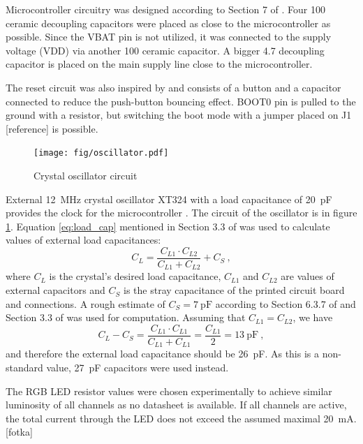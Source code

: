 Microcontroller circuitry was designed according to Section 7 of \cite{f3_design_an}. Four \SI{100}{\nF} ceramic decoupling capacitors were placed as close to the microcontroller as possible. Since the VBAT pin is not utilized, it was connected to the supply voltage (VDD) via another \SI{100}{\nF} ceramic capacitor. A bigger \SI{4.7}{\uF} decoupling capacitor is placed on the main supply line close to the microcontroller.

The reset circuit was also inspired by \cite{f3_design_an} and consists of a button and a capacitor connected to reduce the push-button bouncing effect. BOOT0 pin is pulled to the ground with a resistor, but switching the boot mode with a jumper placed on J1 [\todo reference] is possible.

\begin{figure}[t]
\centering
\texttt{[image: fig/oscillator.pdf]}
\caption{Crystal oscillator circuit}
\label{fig:osc}
\end{figure}

External \SI{12}{\MHz} crystal oscillator XT324 with a load capacitance of \SI{20}{\pF} provides the clock for the microcontroller \cite{xt324_datasheet}. The circuit of the oscillator is in figure \ref{fig:osc}. Equation \ref{eq:load_cap} mentioned in Section 3.3 of \cite{osc_design_an} was used to calculate values of external load capacitances:
\begin{equation}
C_L = \frac{C_{L1} \cdot C_{L2}}{C_{L1} + C_{L2}} + C_S\ ,
\label{eq:load_cap}
\end{equation}
where $C_L$ is the crystal's desired load capacitance, $C_{L1}$ and $C_{L2}$ are values of external capacitors and $C_S$ is the stray capacitance of the printed circuit board and connections. A rough estimate of $C_S = \SI{7}{\pF}$ according to Section 6.3.7 of \cite{f303_datasheet} and Section 3.3 of \cite{osc_design_an} was used for computation. Assuming that $C_{L1} = C_{L2}$, we have
\begin{equation}
C_L - C_S = \frac{C_{L1} \cdot C_{L1}}{C_{L1} + C_{L1}} = \frac{C_{L1}}{2} = \SI{13}{\pF}\ ,
\end{equation}
and therefore the external load capacitance should be \SI{26}{\pF}. As this is a non-standard value, \SI{27}{\pF} capacitors were used instead.

The RGB LED resistor values were chosen experimentally to achieve similar luminosity of all channels as no datasheet is available. If all channels are active, the total current through the LED does not exceed the assumed maximal \SI{20}{\mA}. [\todo fotka]


